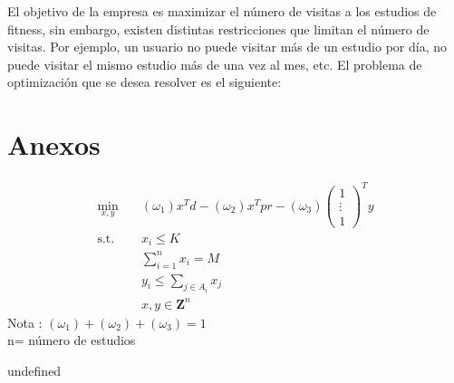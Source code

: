 El objetivo de la empresa es maximizar el número de visitas a los estudios de fitness, sin embargo, existen distintas restricciones que limitan el número de visitas. Por ejemplo, un usuario no puede visitar más de un estudio por día, no puede visitar el mismo estudio más de una vez al mes, etc. El problema de optimización que se desea resolver es el siguiente:

\section{Anexos}

\begin{equation*}
\begin{aligned}
\min_{x,y} \quad & (\omega_1) x^Td - 
(\omega_2) x^Tpr - (\omega_3) \begin{pmatrix} 1 \\ \vdots \\ 1 \end{pmatrix}^T y\\
\textrm{s.t.} \quad & 
x_i \leq K\\
  & \sum_{i = 1}^{n}{x_i} = M   \\
  & y_i \leq \sum_{j \in A_i} x_j\\
  & x, y \in \mathbf{Z}^n 
\end{aligned}
\end{equation*}
Nota : $(\omega_1)+(\omega_2)+(\omega_3)= 1$\\
n= número de estudios






undefined